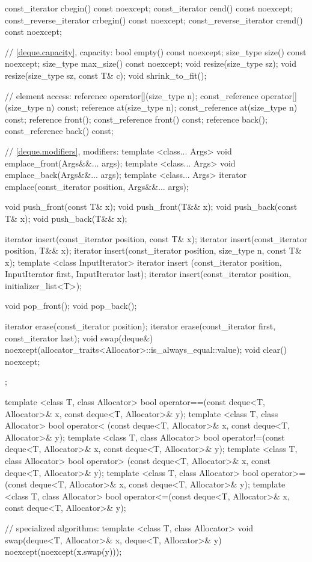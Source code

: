 \begin{codeblock}
{{    const_iterator         cbegin() const noexcept;
    const_iterator         cend() const noexcept;
    const_reverse_iterator crbegin() const noexcept;
    const_reverse_iterator crend() const noexcept;

    // \ref{deque.capacity}, capacity:
    bool      empty() const noexcept;
    size_type size() const noexcept;
    size_type max_size() const noexcept;
    void      resize(size_type sz);
    void      resize(size_type sz, const T& c);
    void      shrink_to_fit();

    // element access:
    reference       operator[](size_type n);
    const_reference operator[](size_type n) const;
    reference       at(size_type n);
    const_reference at(size_type n) const;
    reference       front();
    const_reference front() const;
    reference       back();
    const_reference back() const;

    // \ref{deque.modifiers}, modifiers:
    template <class... Args> void emplace_front(Args&&... args);
    template <class... Args> void emplace_back(Args&&... args);
    template <class... Args> iterator emplace(const_iterator position, Args&&... args);

    void push_front(const T& x);
    void push_front(T&& x);
    void push_back(const T& x);
    void push_back(T&& x);

    iterator insert(const_iterator position, const T& x);
    iterator insert(const_iterator position, T&& x);
    iterator insert(const_iterator position, size_type n, const T& x);
    template <class InputIterator>
      iterator insert (const_iterator position, InputIterator first, InputIterator last);
    iterator insert(const_iterator position, initializer_list<T>);

    void pop_front();
    void pop_back();

    iterator erase(const_iterator position);
    iterator erase(const_iterator first, const_iterator last);
    void     swap(deque&)
      noexcept(allocator_traits<Allocator>::is_always_equal::value);
    void     clear() noexcept;
  };

  template <class T, class Allocator>
    bool operator==(const deque<T, Allocator>& x, const deque<T, Allocator>& y);
  template <class T, class Allocator>
    bool operator< (const deque<T, Allocator>& x, const deque<T, Allocator>& y);
  template <class T, class Allocator>
    bool operator!=(const deque<T, Allocator>& x, const deque<T, Allocator>& y);
  template <class T, class Allocator>
    bool operator> (const deque<T, Allocator>& x, const deque<T, Allocator>& y);
  template <class T, class Allocator>
    bool operator>=(const deque<T, Allocator>& x, const deque<T, Allocator>& y);
  template <class T, class Allocator>
    bool operator<=(const deque<T, Allocator>& x, const deque<T, Allocator>& y);

  // specialized algorithms:
  template <class T, class Allocator>
    void swap(deque<T, Allocator>& x, deque<T, Allocator>& y)
      noexcept(noexcept(x.swap(y)));
}
\end{codeblock}


